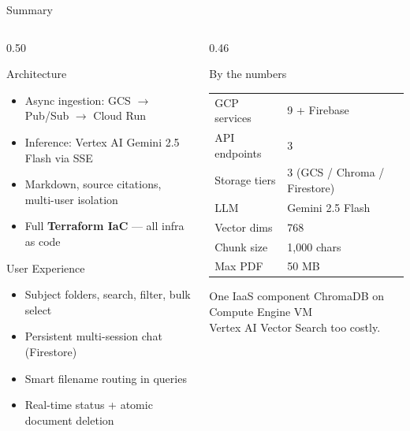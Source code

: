 \documentclass[aspectratio=169]{beamer}
\begin{document}
\begin{frame}[t,shrink=8]{Summary}
  \begin{columns}[t]
    \begin{column}{0.50\textwidth}
      \begin{block}{Architecture}
        {\small\begin{itemize}\setlength\itemsep{0.08em}
          \item Async ingestion: GCS $\to$ Pub/Sub $\to$ Cloud Run
          \item Inference: Vertex AI Gemini 2.5 Flash via SSE
          \item Markdown, source citations, multi-user isolation
          \item Full \textbf{Terraform IaC} — all infra as code
        \end{itemize}}
      \end{block}
      \vspace{0.12cm}
      \begin{block}{User Experience}
        {\small\begin{itemize}\setlength\itemsep{0.08em}
          \item Subject folders, search, filter, bulk select
          \item Persistent multi-session chat (Firestore)
          \item Smart filename routing in queries
          \item Real-time status + atomic document deletion
        \end{itemize}}
      \end{block}
    \end{column}
    \begin{column}{0.46\textwidth}
      \begin{block}{By the numbers}
        {\footnotesize\renewcommand{\arraystretch}{1.2}
        \begin{tabular}{@{}ll@{}}
          GCP services   & 9 + Firebase \\
          API endpoints  & 3 \\
          Storage tiers  & 3 (GCS / Chroma / Firestore) \\
          LLM            & Gemini 2.5 Flash \\
          Vector dims    & 768 \\
          Chunk size     & 1{,}000 chars \\
          Max PDF        & 50 MB \\
        \end{tabular}}
      \end{block}
      \vspace{0.12cm}
      \begin{alertblock}{One IaaS component}
        {\small ChromaDB on Compute Engine VM\\
        Vertex AI Vector Search too costly.}
      \end{alertblock}
    \end{column}
  \end{columns}
\end{frame}
\end{document}
